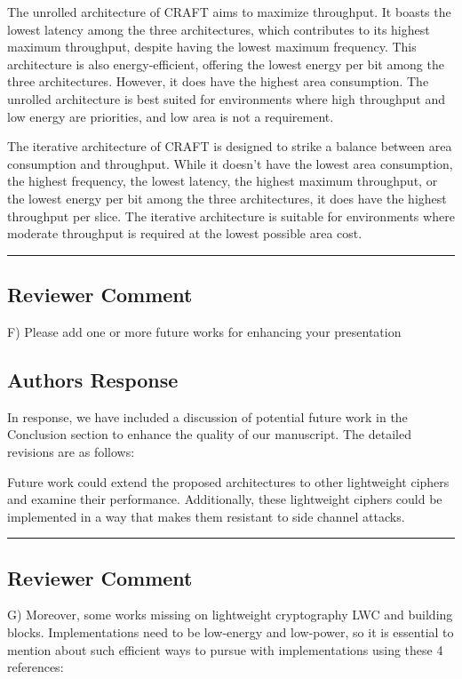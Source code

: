 The unrolled architecture of CRAFT aims to maximize throughput. It boasts the lowest latency among the three architectures, which contributes to its highest maximum throughput, despite having the lowest maximum frequency. This architecture is also energy-efficient, offering the lowest energy per bit among the three architectures. However, it does have the highest area consumption. The unrolled architecture is best suited for environments where high throughput and low energy are priorities, and low area is not a requirement.

The iterative architecture of CRAFT is designed to strike a balance between area consumption and throughput. While it doesn't have the lowest area consumption, the highest frequency, the lowest latency, the highest maximum throughput, or the lowest energy per bit among the three architectures, it does have the highest throughput per slice. The iterative architecture is suitable for environments where moderate throughput is required at the lowest possible area cost.

\color{black}

\noindent\rule{\linewidth}{2.0pt}

\subsection{Reviewer Comment}
F) Please add one or more future works for enhancing your presentation

\subsection{Authors Response}

In response, we have included a discussion of potential future work in the Conclusion section to enhance the quality of our manuscript. The detailed revisions are as follows:

\color{blue}

Future work could extend the proposed architectures to other lightweight ciphers and examine their performance. Additionally, these lightweight ciphers could be implemented in a way that makes them resistant to side channel attacks.

\color{black}

\noindent\rule{\linewidth}{2.0pt}

\subsection{Reviewer Comment}
G) Moreover, some works missing on lightweight cryptography LWC and building blocks. Implementations need to be low-energy and low-power, so it is essential to mention about such efficient ways to pursue with implementations using these 4 references:

